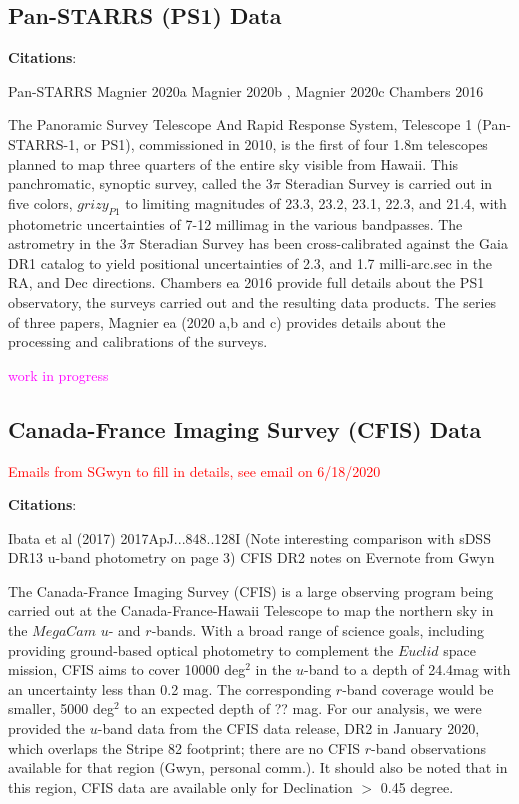 \documentclass{aastex63}
\newcommand{\tbd}[1]{\textcolor{red}{#1}} %
\newcommand{\KT}[1]{\textcolor{magenta}{#1}} %
\begin{document}

\subsection{Pan-STARRS (PS1) Data} \label{ssec:ps1}

{\bf Citations}: 

Pan-STARRS \citep{2010SPIE.7733E..0EK}
\citep{2020ApJS..251....6M} Magnier 2020a
\citep{2020ApJS..251....3M} Magnier 2020b
\citep{2020ApJS..251....5M}, Magnier 2020c
\citep{2016arXiv161205560C} Chambers 2016

The Panoramic Survey Telescope And Rapid Response System, Telescope 1 (Pan-STARRS-1, or PS1), commissioned in 2010, is the first of four 1.8m telescopes planned to map three quarters of the entire sky visible from Hawaii. This panchromatic, synoptic survey, called the 3$\pi$ Steradian Survey is carried out in five colors, $grizy_{P1}$ to limiting magnitudes of 23.3, 23.2, 23.1, 22.3, and 21.4, with photometric uncertainties of 7-12 millimag in the various bandpasses. The astrometry in the 3$\pi$ Steradian Survey has been cross-calibrated against the Gaia DR1 catalog to yield positional uncertainties of 2.3, and 1.7 milli-arc.sec in the RA, and Dec directions. Chambers ea 2016 provide full details about the PS1 observatory, the surveys carried out and the resulting data products. The series of three papers, Magnier ea (2020 a,b and c) provides details about the processing and calibrations of the surveys. 
  
  \KT{work in progress} 

\subsection{Canada-France Imaging Survey (CFIS) Data} \label{ssec:cfis}

\tbd{Emails from SGwyn to fill in details, see email on 6/18/2020}

{\bf Citations}: 

Ibata et al (2017) 2017ApJ...848..128I (Note interesting comparison with sDSS DR13 u-band photometry on page 3) 
CFIS DR2 notes on Evernote from Gwyn

The Canada-France Imaging Survey (CFIS) is a large observing program being carried out at the Canada-France-Hawaii Telescope to map the northern sky in the $MegaCam$ $u$- and $r$-bands. With a broad range of science goals, including providing ground-based optical photometry to complement the $Euclid$ space mission, CFIS aims to cover 10000 deg$^2$ in the $u$-band to a depth of 24.4mag with an uncertainty less than 0.2 mag. The corresponding $r$-band coverage would be smaller, 5000 deg$^2$ to an expected depth of ?? mag. For our analysis, we were provided the $u$-band data from the CFIS data release, DR2 in January 2020, which overlaps the Stripe 82 footprint; there are no CFIS $r$-band observations available for that region (Gwyn, personal comm.).  It should also be noted that in this region, CFIS data are available only for Declination $>$ 0.45 degree.
\end{document}
